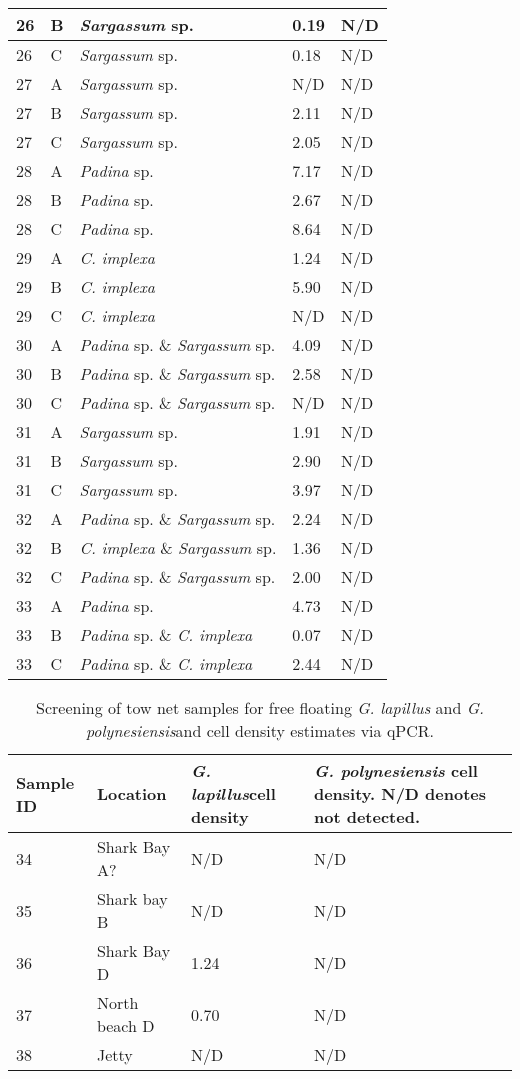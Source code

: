 \documentclass[12pt]{article}
\begin{document}
\begin{longtable}{ | p{1cm} | p{1cm} | p{3cm} | p{4cm} | p{4cm} | }
\hline
26&B&\emph{Sargassum} sp.&0.19
&N/D\\
\hline
26&C&\emph{Sargassum} sp.&0.18
&N/D\\
\hline
27&A&\emph{Sargassum} sp.&N/D&N/D\\
\hline
27&B&\emph{Sargassum} sp.&2.11
&N/D\\
\hline
27&C&\emph{Sargassum} sp.&2.05
&N/D\\
\hline
28&A&\emph{Padina} sp.&7.17
&N/D\\
\hline
28&B&\emph{Padina} sp.&2.67
&N/D\\
\hline
28&C&\emph{Padina} sp.&8.64
&N/D\\
\hline
29&A&\emph{C. implexa}&1.24
&N/D\\
\hline
29&B&\emph{C. implexa}&5.90
&N/D\\
\hline
29&C&\emph{C. implexa}&N/D&N/D\\
\hline
30&A&\emph{Padina} sp. \& \emph{Sargassum} sp.&4.09
&N/D\\
\hline
30&B&\emph{Padina} sp. \& \emph{Sargassum} sp.&2.58
&N/D\\
\hline
30&C&\emph{Padina} sp. \& \emph{Sargassum} sp.&N/D&N/D\\
\hline
31&A&\emph{Sargassum} sp.&1.91
&N/D\\
\hline
31&B&\emph{Sargassum} sp.&2.90
&N/D\\
\hline
31&C&\emph{Sargassum} sp.&3.97
&N/D\\
\hline
32&A&\emph{Padina} sp. \& \emph{Sargassum} sp.&2.24
&N/D\\
\hline
32&B&\emph{C. implexa} \& \emph{Sargassum} sp.&1.36
&N/D\\
\hline
32&C&\emph{Padina} sp. \& \emph{Sargassum} sp.&2.00
&N/D\\
\hline
33&A&\emph{Padina} sp.&4.73
&N/D\\
\hline
33&B&\emph{Padina} sp. \& \emph{C. implexa}&0.07
&N/D\\
\hline
33&C&\emph{Padina} sp. \& \emph{C. implexa}&2.44
&N/D\\
\hline
\end{longtable}
\FloatBarrier
\FloatBarrier
\begin{table}
\caption{Screening of tow net samples for free floating \emph{G. lapillus} and \emph{G. polynesiensis}and cell density estimates via qPCR.}
\label{tbl:NetTable}
\begin{tabular}{ | p{4cm} | p{4cm} |p{4cm} | p{4cm} | }
\hline
\textbf{Sample ID}&\textbf{Location}&\textbf{\emph{G. lapillus}cell density}&\textbf{\emph{G. polynesiensis} cell density. N/D denotes not detected.}\\
\hline
34&Shark Bay A?&N/D&N/D\\
\hline
35&Shark bay B&N/D&N/D\\
\hline
36&Shark Bay D&1.24
&N/D\\
\hline
37&North beach D&0.70
&N/D\\
\hline
38&Jetty&N/D
&N/D\\
\hline
\end{tabular}
\end{table}
\FloatBarrier
\end{document}
